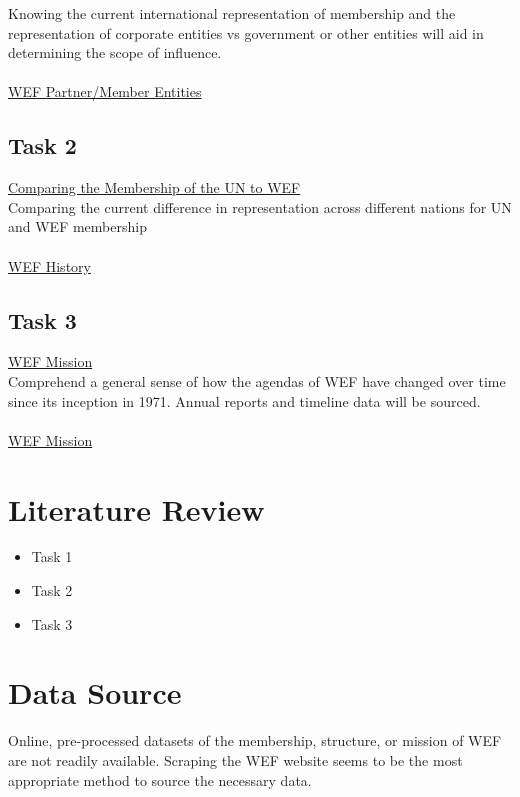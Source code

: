 \documentclass{article}
\begin{document}
Knowing the current international representation of membership and the representation of corporate entities vs government or other entities will aid in determining the scope of influence.
\\
\\
\href{https://www.weforum.org/partners}{WEF Partner/Member Entities}

\subsection*{Task 2}
\underline{Comparing the Membership of the UN to WEF}
\\

Comparing the current difference in representation across different nations for UN and WEF membership
\\
\\
\href{https://www.weforum.org/about/history}{WEF History}

\subsection*{Task 3}
\underline{WEF Mission}
\\

Comprehend a general sense of how the agendas of WEF have changed over time since its inception in 1971. Annual reports and timeline data will be sourced.
\\
\\
\href{https://www.weforum.org/about/world-economic-forum}{WEF Mission}

\section*{Literature Review}

\begin{itemize}
\item Task 1
\item Task 2
\item Task 3
\end{itemize}




\section*{Data Source}

Online, pre-processed datasets of the membership, structure, or mission  of WEF are not readily available. Scraping the WEF website seems to be the most appropriate method to source the necessary data. 
\end{document}
